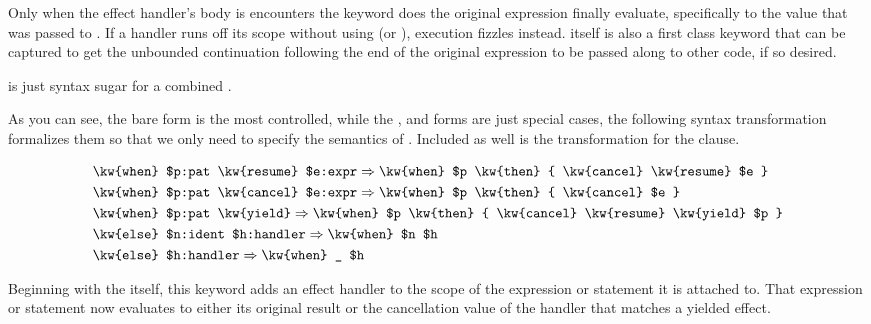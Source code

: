 Only when the effect handler's body is encounters the  keyword does the original
expression finally evaluate, specifically to the value that was passed to .
If a handler runs off its scope without using  (or ), execution
fizzles instead.  itself is also a first class keyword that can be captured
to get the unbounded continuation following the end of the original expression to be
passed along to other code, if so desired.

 is just syntax sugar for a combined .

As you can see, the bare  form is the most controlled, while the ,
 and  forms are just special cases, the following syntax
transformation formalizes them so that we only need to specify the semantics of
. Included as well is the transformation for the  clause.

\begin{align*}
    & \texttt{\kw{when} \$p:pat \kw{resume} \$e:expr} \Rightarrow \texttt{\kw{when} \$p \kw{then} \{ \kw{cancel} \kw{resume} \$e \}} \\ %
    & \texttt{\kw{when} \$p:pat \kw{cancel} \$e:expr} \Rightarrow \texttt{\kw{when} \$p \kw{then} \{ \kw{cancel} \$e \}} \\ %
    & \texttt{\kw{when} \$p:pat \kw{yield}} \Rightarrow \texttt{\kw{when} \$p \kw{then} \{ \kw{cancel} \kw{resume} \kw{yield} \$p \}} \\ %
    & \texttt{\kw{else} \$n:ident \$h:handler} \Rightarrow \texttt{\kw{when} \$n \$h} \\ %
    & \texttt{\kw{else} \$h:handler} \Rightarrow \texttt{\kw{when} \_ \$h} \\ %
\end{align*}

Beginning with the  itself, this keyword adds an effect handler to the scope
of the expression or statement it is attached to. That expression or statement now
evaluates to either its original result or the cancellation value of the handler that
matches a yielded effect.

\begin{prooftree}
\end{prooftree}


